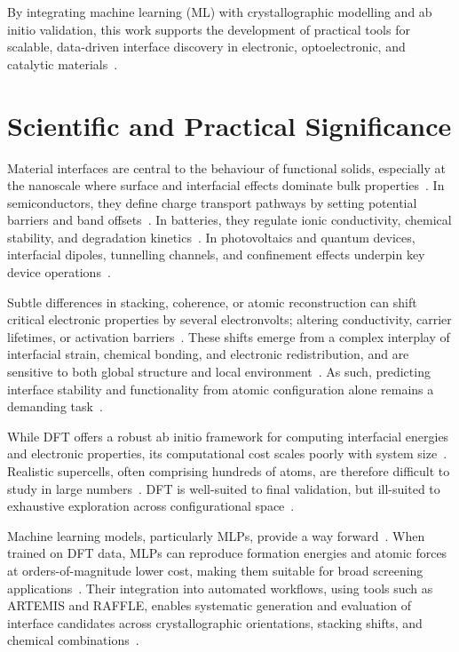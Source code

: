\label{objectives_impact} By integrating machine learning (ML) with crystallographic modelling and ab initio validation, this work supports the development of practical tools for scalable, data-driven interface discovery in electronic, optoelectronic, and catalytic materials~\nocite{}.


\newpage \section{Scientific and Practical Significance} \label{section:scientific_and_practical_significance}

\label{interfaces_nanoscale_behaviour} Material interfaces are central to the behaviour of functional solids, especially at the nanoscale where surface and interfacial effects dominate bulk properties~\cite{Chagarov2015-ol, Leitherer2023-ew, Khot2025-hh, Cervantes2025-ze}.
In semiconductors, they define charge transport pathways by setting potential barriers and band offsets~\cite{Low2025-on}.
In batteries, they regulate ionic conductivity, chemical stability, and degradation kinetics~\cite{Leung2020-tv}.
In photovoltaics and quantum devices, interfacial dipoles, tunnelling channels, and confinement effects underpin key device operations~\cite{Low2025-on, Cervantes2025-ze}.

\label{interfacial_electronic_shifts} Subtle differences in stacking, coherence, or atomic reconstruction can shift critical electronic properties by several electronvolts; altering conductivity, carrier lifetimes, or activation barriers~\nocite{}.
These shifts emerge from a complex interplay of interfacial strain, chemical bonding, and electronic redistribution, and are sensitive to both global structure and local environment~\cite{Batzner2022-fd, Gerber2023-yd, Davies2024-ju}.
As such, predicting interface stability and functionality from atomic configuration alone remains a demanding task~\nocite{}.

\label{dft_scaling_cost} While DFT offers a robust ab initio framework for computing interfacial energies and electronic properties, its computational cost scales poorly with system size~\cite{Schutt2019-sz, Leung2020-tv, Cervantes2025-ze}.
Realistic supercells, often comprising hundreds of atoms, are therefore difficult to study in large numbers~\nocite{}.
DFT is well-suited to final validation, but ill-suited to exhaustive exploration across configurational space~\nocite{}.

\label{mlp_workflow_integration} Machine learning models, particularly MLPs, provide a way forward~\nocite{}.
When trained on DFT data, MLPs can reproduce formation energies and atomic forces at orders-of-magnitude lower cost, making them suitable for broad screening applications~\nocite{}.
Their integration into automated workflows, using tools such as ARTEMIS and RAFFLE, enables systematic generation and evaluation of interface candidates across crystallographic orientations, stacking shifts, and chemical combinations~\cite{artemis_paper, raffle_paper}.

